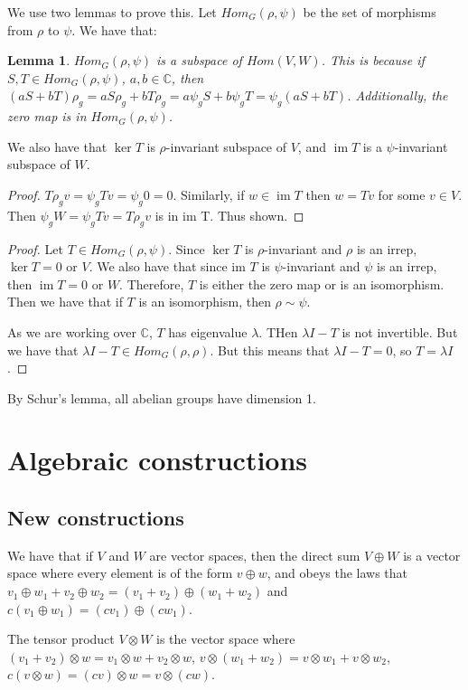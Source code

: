 \documentclass[]{report}
\newtheorem{lemma}[theorem]{Lemma}
\theoremstyle{definition}
\numberwithin{theorem}{section}
\numberwithin{equation}{section}
\newcommand{\im}{\operatorname{im}}
\begin{document}
We use two lemmas to prove this. 
Let $Hom_G( \rho, \psi)$ be the set of morphisms from $\rho$ to $\psi$. We have that:
\begin{lemma}
	$Hom_G( \rho, \psi)$ is a subspace of $Hom(V, W)$. This is because if $S, T \in Hom_G(\rho, \psi)$, $a, b \in \mathbb{C}$, then $(a S + b T) \rho_g = a S \rho_g + b T \rho_g = a \psi_g S + b \psi_g T = \psi_g (a S + b T)$. Additionally, the zero map is in $Hom_G( \rho, \psi)$. 
\end{lemma}

We also have that $\ker T$ is $\rho$-invariant subspace of $V$, and $\im T$ is a $\psi$-invariant subspace of $W$.
\begin{proof}
	$T \rho_g v = \psi_g T v = \psi_g 0 = 0$. Similarly, if $w \in \im T$ then $w = T v$ for some $v \in V$. Then $\psi_g W = \psi_g T v = T \rho_g v$ is in im T. Thus shown.
\end{proof}

\begin{proof}
	Let $T \in Hom_G( \rho, \psi)$. Since $\ker T$ is $\rho$-invariant and $\rho$ is an irrep, $\ker T = 0$ or $V$. We also have that since im $T$ is $\psi$-invariant and $\psi$ is an irrep, then $\im T = 0$ or $W$. Therefore, $T$ is either the zero map or is an isomorphism. Then we have that if $T$ is an isomorphism, then $\rho \sim \psi$. 
	
	As we are working over $\mathbb{C}$, $T$ has eigenvalue $\lambda$. THen $\lambda I - T$ is not invertible. But we have that $\lambda I - T \in Hom_G(\rho, \rho)$. But this means that $\lambda I - T = 0$, so $T = \lambda I$. 
\end{proof}

By Schur's lemma, all abelian groups have dimension 1. 

\chapter{Algebraic constructions}
\section{New constructions}
We have that if $V$ and $W$ are vector spaces, then the direct sum $V \oplus W$ is a vector space where every element is of the form $v \oplus w$, and obeys the laws that $v_1 \oplus w_1 + v_2 \oplus w_2 = (v_1 + v_2) \oplus (w_1 + w_2)$ and $c (v_1 \oplus w_1) = (c v_1) \oplus (c w_1)$. 

The tensor product $V \otimes W$ is the vector space where $(v_1 + v_2) \otimes w = v_1 \otimes w + v_2 \otimes w$, $v \otimes (w_1 + w_2) = v \otimes w_1 + v \otimes w_2$, $c (v \otimes w) = (cv) \otimes w = v \otimes (cw)$. 
\end{document}
